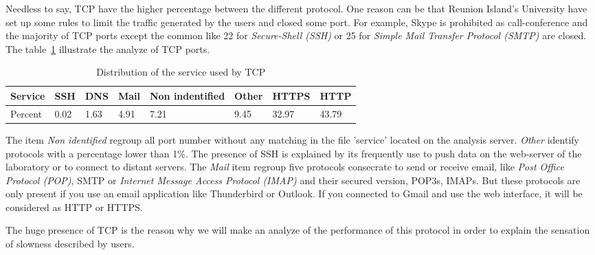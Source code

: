 \documentclass[10pt, conference, a4paper, twocolumns]{IEEEtran}
\def\yassine#1{\textbf{\textcolor{blue}{yassine : #1}}}
\begin{document}
Needless to say, TCP have the higher percentage between the different protocol. One reason can be that Reunion Island's University have set up some rules to limit the traffic generated by the users and closed some port. For example, Skype is prohibited as call-conference and the majority of TCP ports except the common like 22 for \emph{Secure-Shell (SSH)} or 25 for \emph{Simple Mail Transfer Protocol (SMTP)} are closed.%
The table~\ref{tab:service} illustrate the analyze of TCP ports. 
\begin{table}[ht!]
\centering
\caption{Distribution of the service used by TCP}
\label{tab:service}
\begin{tabular}{|p{}|p{}|p{}|p{}|p{}|p{}|p{}|p{}|}
\hline
Service & SSH & DNS & Mail & Non indentified & Other & HTTPS & HTTP \\ \hline
Percent & 0.02 & 1.63 & 4.91 & 7.21 & 9.45 & 32.97 & 43.79 \\ \hline
\end{tabular}
\end{table}
The item \emph{Non identified} regroup all port number without any matching in the file 'service' located on the analysis server. \emph{Other} identify protocols with a percentage lower than 1\%. The presence of SSH is explained by its frequently use to push data on the web-server of the laboratory or to connect to distant servers.
The \emph{Mail} item regroup five protocols consecrate to send or receive email, like \emph{Post Office Protocol (POP)}, SMTP or \emph{Internet Message Access Protocol (IMAP)} and their secured version, POP3s, IMAPs. But these protocols are only present if you use an email application like Thunderbird or Outlook. If you connected to Gmail and use the web interface, it will be considered as HTTP or HTTPS.

The huge presence of TCP is the reason why we will make an %
analyze of the performance of this protocol in order to explain the sensation of slowness described by users.
\end{document}
